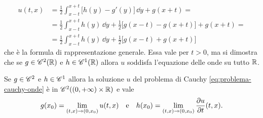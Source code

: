 \begin{equation}
    \begin{split}
        u(t,x)&=
        \frac12\int_{x-t}^{x+t}\bigl[h(y)-g'(y)\bigr]\,\dd y+g(x+t)=\\ &=
        \frac12\int_{x-t}^{x+t}h(y)\,\dd y+\frac12\bigl[g(x-t)-g(x+t)\bigr]+g(x+t)=\\ &=
        \frac12\int_{x-t}^{x+t}h(y)\,\dd y+\frac12\bigl[g(x-t)+g(x+t)\bigr]
    \end{split}
    \label{eq:rappresentazione-soluzione-onde}
\end{equation}
che è la formula di rappresentazione generale.
Essa vale per $t>0$, ma si dimostra che se $g\in\cont[2]{\R}$ e $h\in\cont[1]{\R}$ allora $u$ soddisfa l'equazione delle onde su tutto $\R$.
\begin{teorema}
    Se $g\in\cclass[2]$ e $h\in\cclass[1]$ allora la soluzione $u$ del problema di Cauchy \eqref{eq:problema-cauchy-onde} è in $\cont[2]{(0,+\infty)\times\R}$ e vale
    \begin{equation}
        g(x_0)=\lim_{(t,x)\to(0,x_0)}u(t,x)
        \qtext{e}
        h(x_0)=\lim_{(t,x)\to(0,x_0)}\drp{u}{t}(t,x).
    \end{equation}
\end{teorema}
